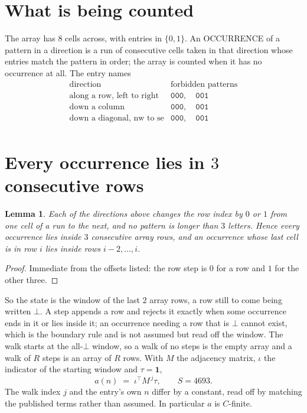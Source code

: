 \documentclass[11pt,a4paper]{article}
\theoremstyle{plain}
\newtheorem{lemma}[theorem]{Lemma}
\theoremstyle{definition}
\begin{document}
\section{What is being counted}

The array has $8$ cells across, with entries in $\{0,1\}$. An OCCURRENCE of a pattern in a
direction is a run of consecutive cells taken in that direction whose entries match the pattern
in order; the array is counted when it has no occurrence at all. The entry names
\[
\begin{array}{ll}
\text{direction} & \text{forbidden patterns} \\[2pt]
\text{along a row, left to right} & \mathtt{000},\quad \mathtt{001} \\
\text{down a column} & \mathtt{000},\quad \mathtt{001} \\
\text{down a diagonal, nw to se} & \mathtt{000},\quad \mathtt{001} \\
\end{array}
\]


\section{Every occurrence lies in $3$ consecutive rows}

\begin{lemma}\label{lem:win}
Each of the directions above changes the row index by $0$ or $1$ from one cell of a run to the
next, and no pattern is longer than $3$ letters. Hence every occurrence lies inside $3$
consecutive array rows, and an occurrence whose last cell is in row $i$ lies inside rows
$i-2,\dots,i$.
\end{lemma}

\begin{proof}
Immediate from the offsets listed: the row step is $0$ for a row and $1$ for the other three.
\end{proof}

So the state is the window of the last $2$ array rows, a row still to come being written
$\bot$. A step appends a row and rejects it exactly when some occurrence ends in it or lies
inside it; an occurrence needing a row that is $\bot$ cannot exist, which is the boundary rule
and is not assumed but read off the window. The walk starts at the all-$\bot$ window, so a walk
of no steps is the empty array and a walk of $R$ steps is an array of $R$ rows. With $M$ the
adjacency matrix, $\iota$ the indicator of the starting window and $\tau=\mathbf{1}$,
\[
a(n)\;=\;\iota^{\!\top}M^{\,j}\tau ,\qquad S=4693.
\]
The walk index $j$ and the entry's own $n$ differ by a constant, read off by matching the
published terms rather than assumed. In particular $a$ is $C$-finite.
\end{document}
